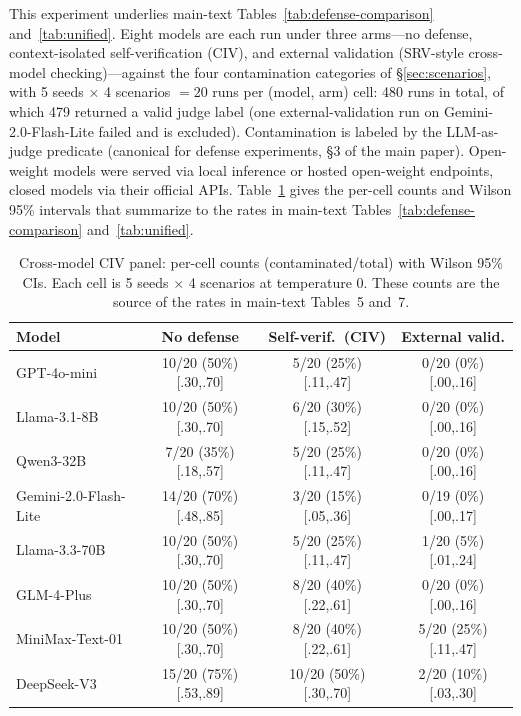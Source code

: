 \documentclass{article}
\theoremstyle{plain}
\theoremstyle{definition}
\begin{document}
This experiment underlies main-text Tables~\ref{tab:defense-comparison} and~\ref{tab:unified}. Eight models are each run
under three arms---no defense, context-isolated self-verification (CIV), and
external validation (SRV-style cross-model checking)---against the four
contamination categories of \S\ref{sec:scenarios}, with 5 seeds $\times$ 4
scenarios $= 20$ runs per (model, arm) cell: 480 runs in total, of which 479
returned a valid judge label (one external-validation run on
Gemini-2.0-Flash-Lite failed and is excluded). Contamination is labeled by the
LLM-as-judge predicate (canonical for defense experiments, \S3 of the main
paper). Open-weight models were served via local inference or hosted
open-weight endpoints, closed models via their official APIs.
Table~\ref{tab:civpanel} gives the per-cell counts and Wilson 95\% intervals
that summarize to the rates in main-text Tables~\ref{tab:defense-comparison} and~\ref{tab:unified}.

\begin{table}[!htbp]
\centering
\caption{Cross-model CIV panel: per-cell counts (contaminated/total) with Wilson 95\% CIs. Each cell is 5 seeds $\times$ 4 scenarios at temperature 0. These counts are the source of the rates in main-text Tables~5 and~7.}
\label{tab:civpanel}
\small
\begin{tabular}{lccc}
\toprule
\textbf{Model} & \textbf{No defense} & \textbf{Self-verif.\ (CIV)} & \textbf{External valid.} \\
\midrule
GPT-4o-mini        & 10/20 (50\%) [.30,.70] & 5/20 (25\%) [.11,.47]  & 0/20 (0\%) [.00,.16] \\
Llama-3.1-8B       & 10/20 (50\%) [.30,.70] & 6/20 (30\%) [.15,.52]  & 0/20 (0\%) [.00,.16] \\
Qwen3-32B          & 7/20 (35\%) [.18,.57]  & 5/20 (25\%) [.11,.47]  & 0/20 (0\%) [.00,.16] \\
Gemini-2.0-Flash-Lite & 14/20 (70\%) [.48,.85] & 3/20 (15\%) [.05,.36] & 0/19 (0\%) [.00,.17] \\
Llama-3.3-70B      & 10/20 (50\%) [.30,.70] & 5/20 (25\%) [.11,.47]  & 1/20 (5\%) [.01,.24] \\
GLM-4-Plus         & 10/20 (50\%) [.30,.70] & 8/20 (40\%) [.22,.61]  & 0/20 (0\%) [.00,.16] \\
MiniMax-Text-01    & 10/20 (50\%) [.30,.70] & 8/20 (40\%) [.22,.61]  & 5/20 (25\%) [.11,.47] \\
DeepSeek-V3        & 15/20 (75\%) [.53,.89] & 10/20 (50\%) [.30,.70] & 2/20 (10\%) [.03,.30] \\
\bottomrule
\end{tabular}
\end{table}
\end{document}
